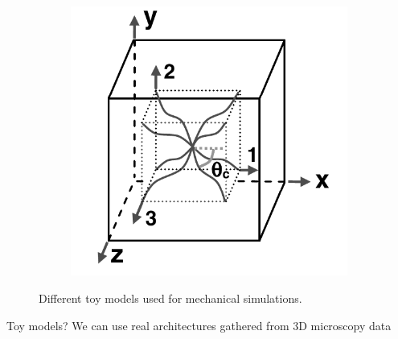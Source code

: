 \documentclass[9pt]{beamer}
\begin{document}
\begin{frame}
\begin{figure}
\begin{subfigure}[t]{0.33\textwidth}
      \label{subfig:fcc_lattice}
    \end{subfigure}%
    \begin{subfigure}[t]{0.33\textwidth}
      \centering
      \includegraphics[width=0.9\linewidth]{Figures/eightchain-simple.png}
      \label{subfig:eightchain}
    \end{subfigure}
    \caption{Different toy models used for mechanical simulations.}
    \label{fig:toy-models}
  \end{figure}
  \begin{center}
    \begin{exampleblock}{Toy models? We can use real architectures gathered from 3D microscopy data}
    \end{exampleblock}
  \end{center}
\end{frame}
\end{document}
